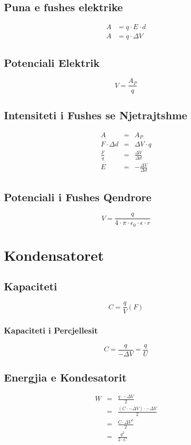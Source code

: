 \documentclass[a4paper, twocolumn]{article}
\begin{document}
\subsection{Puna e fushes elektrike}
\begin{align*}
	A &= q\cdot E\cdot d\\
	A &= q\cdot \Delta V
\end{align*}
\subsection{Potenciali Elektrik}
\[
V=\frac{A_{P}}{q}
\]
\subsection{Intensiteti i Fushes se Njetrajtshme}
\begin{eqnarray*}
	A&=&A_{P}\\
	F\cdot \Delta d &=& \Delta V \cdot q\\
	\frac{F}{q}&=& \frac{\Delta V}{\Delta d}\\
	E &=& -\frac{\Delta V}{\Delta d}\\
\end{eqnarray*}
\subsection{Potenciali i Fushes Qendrore}
\[
V=\frac{q}{4\cdot \pi \cdot \epsilon _{0} \cdot \epsilon \cdot r}
\]
\section{Kondensatoret}
\subsection{Kapaciteti}
\[
	C=\frac{q}{V} (F)
\]
\subsubsection{Kapaciteti i Percjellesit}
\[
C=\frac{q}{-\Delta V}=\frac{q}{U}
\]
\subsection{Energjia e Kondesatorit}
\begin{eqnarray*}
	W&=&\frac{q\cdot -\Delta V}{2}\\
	 &=&\frac{(C\cdot- \Delta V)\cdot- \Delta V}{2}\\
	 &=&\frac{C\cdot \Delta V^2}{2}\\
	 &=&\frac{q^2}{2\cdot C}
\end{eqnarray*}
\end{document}
